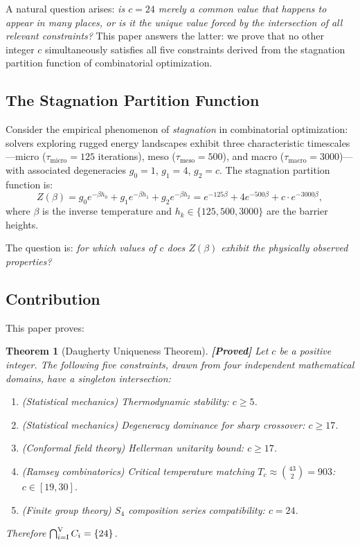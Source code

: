 \documentclass[12pt,a4paper]{article}
\newcommand{\proved}[1]{\textcolor{proved}{\textbf{[Proved]}} #1}
\newtheorem{theorem}{Theorem}[section]
\theoremstyle{definition}
\theoremstyle{remark}
\newcommand{\Sfour}{S_4}
\newcommand{\Zpart}{Z(\beta)}
\begin{document}
A natural question arises: \emph{is $c = 24$ merely a common value that happens to appear in many places, or is it the unique value forced by the intersection of all relevant constraints?}  This paper answers the latter: we prove that no other integer $c$ simultaneously satisfies all five constraints derived from the stagnation partition function of combinatorial optimization.

\subsection{The Stagnation Partition Function}

Consider the empirical phenomenon of \emph{stagnation} in combinatorial optimization: solvers exploring rugged energy landscapes exhibit three characteristic timescales---micro ($\tau_{\text{micro}} = 125$ iterations), meso ($\tau_{\text{meso}} = 500$), and macro ($\tau_{\text{macro}} = 3000$)---with associated degeneracies $g_0 = 1$, $g_1 = 4$, $g_2 = c$.  The stagnation partition function is:
\begin{equation}
\label{eq:zpart}
\Zpart = g_0 e^{-\beta h_0} + g_1 e^{-\beta h_1} + g_2 e^{-\beta h_2} = e^{-125\beta} + 4 e^{-500\beta} + c \cdot e^{-3000\beta},
\end{equation}
where $\beta$ is the inverse temperature and $h_k \in \{125, 500, 3000\}$ are the barrier heights.

The question is: \emph{for which values of $c$ does $\Zpart$ exhibit the physically observed properties?}

\subsection{Contribution}

This paper proves:

\begin{theorem}[Daugherty Uniqueness Theorem]
\label{thm:main}
\proved{Let $c$ be a positive integer.  The following five constraints, drawn from four independent mathematical domains, have a singleton intersection:}
\begin{enumerate}[label=\textup{(\Roman*)}]
\item \textup{(Statistical mechanics)} Thermodynamic stability: $c \ge 5$.
\item \textup{(Statistical mechanics)} Degeneracy dominance for sharp crossover: $c \ge 17$.
\item \textup{(Conformal field theory)} Hellerman unitarity bound: $c \ge 17$.
\item \textup{(Ramsey combinatorics)} Critical temperature matching $T_c \approx \binom{43}{2} = 903$: $c \in [19, 30]$.
\item \textup{(Finite group theory)} $\Sfour$ composition series compatibility: $c = 24$.
\end{enumerate}
\textup{Therefore} $\bigcap_{i=\textup{I}}^{\textup{V}} C_i = \{24\}$.
\end{theorem}
\end{document}
